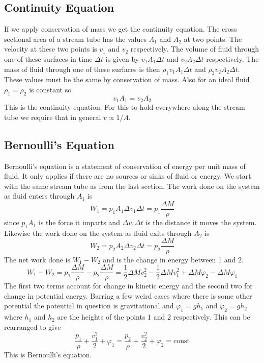 \documentclass{article}
\begin{document}
    \subsection{Continuity Equation}
    If we apply conservation of mass we get the continuity equation.
    The cross sectional area of a stream tube has the values \(A_1\) and \(A_2\) at two points.
    The velocity at these two points is \(v_1\) and \(v_2\) respectively.
    The volume of fluid through one of these surfaces in time \(\Delta t\) is given by \(v_1A_1\Delta t\) and \(v_2A_2\Delta t\) respectively.
    The mass of fluid through one of these surfaces is then \(\rho_1v_1A_1\Delta t\) and \(\rho_2v_2A_2\Delta t\).
    These values must be the same by conservation of mass.
    Also for an ideal fluid \(\rho_1 = \rho_2\) is constant so
    \[v_1A_1 = v_2A_2\]
    This is the continuity equation.
    For this to hold everywhere along the stream tube we require that in general \(v\propto 1/A\).
    
    \subsection{Bernoulli's Equation}
    Bernoulli's equation is a statement of conservation of energy per unit mass of fluid.
    It only applies if there are no sources or sinks of fluid or energy.
    We start with the same stream tube as from the last section.
    The work done on the system as fluid enters through \(A_1\) is
    \[W_1 = p_1A_1\Delta v_1\Delta t = p_1\frac{\Delta M}{\rho}\]
    since \(p_1A_1\) is the force it imparts and \(\Delta v_1\Delta t\) is the distance it moves the system.
    Likewise the work done on the system as fluid exits through \(A_2\) is
    \[W_2 = p_2A_2\Delta v_2\Delta t = p_2\frac{\Delta M}{\rho}\]
    The net work done is \(W_1 - W_2\) and is the change in energy between 1 and 2.
    \[W_1 - W_2 = p_1\frac{\Delta M}{\rho} - p_2\frac{\Delta M}{\rho} = \frac{1}{2}\Delta Mv_2^2 - \frac{1}{2}\Delta M v_1^2 + \Delta M\varphi_2 - \Delta M\varphi_1\]
    The first two terms account for change in kinetic energy and the second two for change in potential energy. Barring a few weird cases where there is some other potential the potential in question is gravitational and \(\varphi_1 = gh_1\) and \(\varphi_2 = gh_2\) where \(h_1\) and \(h_2\) are the heights of the points 1 and 2 respectively.
    This can be rearranged to give
    \[\frac{p_1}{\rho} + \frac{v_1^2}{2} + \varphi_1 = \frac{p_2}{\rho} + \frac{v_2^2}{2} + \varphi_2 = \text{const}\]
    This is Bernoulli's equation.
    
\end{document}
